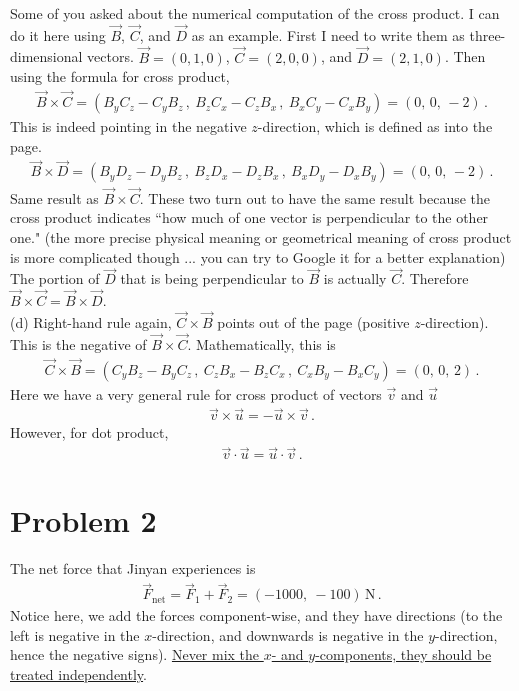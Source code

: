 \documentclass[11pt]{article}
\begin{document}
 Some of you asked about the numerical computation of the cross product. I can do it here using $\vec{B}$, $\vec{C}$, and $\vec{D}$ as an example. First I need to write them as three-dimensional vectors. $\vec{B} = (0,1,0)$, $\vec{C} = (2,0,0)$, and $\vec{D} = (2,1,0)$. Then using the formula for cross product, 
\begin{align*}
\vec{B}\times \vec{C} = \left(
B_yC_z - C_yB_z\,,\
B_zC_x - C_zB_x\,,\
B_xC_y - C_xB_y
\right) = (0,\,0,\,-2)\,.
\end{align*}
This is indeed pointing in the negative $z$-direction, which is defined as into the page.
\begin{align*}
\vec{B}\times \vec{D} = \left(
B_yD_z - D_yB_z\,,\
B_zD_x - D_zB_x\,,\
B_xD_y - D_xB_y
\right) = (0,\,0,\,-2)\,.
\end{align*}
Same result as $\vec{B}\times \vec{C}$. These two turn out to have the same result because the cross product indicates ``how much of one vector is perpendicular to the other one." (the more precise physical meaning or geometrical meaning of cross product is more complicated though ... you can try to Google it for a better explanation) The portion of $\vec{D}$ that is being perpendicular to $\vec{B}$ is actually $\vec{C}$. Therefore $\vec{B}\times \vec{C} = \vec{B}\times \vec{D}$.\\

\noindent (d) Right-hand rule again, $\vec{C}\times \vec{B}$ points out of the page (positive $z$-direction). This is the negative of $\vec{B}\times \vec{C}$. Mathematically, this is
\begin{align*}
\vec{C}\times \vec{B} = \left(
C_yB_z - B_yC_z\,,\
C_zB_x - B_zC_x\,,\
C_xB_y - B_xC_y
\right) = (0,\,0,\,2)\,.
\end{align*}
Here we have a very general rule for cross product of vectors $\vec{v}$ and $\vec{u}$
\begin{align*}
\vec{v}\times \vec{u} = -\vec{u}\times \vec{v}\,.
\end{align*}
However, for dot product, 
\begin{align*}
\vec{v}\cdot\vec{u} = \vec{u}\cdot \vec{v}\,.
\end{align*}

\section*{Problem 2}
The net force that Jinyan experiences is 
\begin{align*}
\vec{F}_{\text{net}} = \vec{F}_1 + \vec{F}_2 = (-1000,\ -100) \,\text{N}\,.
\end{align*}
Notice here, we add the forces component-wise, and they have directions (to the left is negative in the $x$-direction, and downwards is negative in the $y$-direction, hence the negative signs). \underline{Never mix the $x$- and $y$-components, they should be treated independently}.\\
\end{document}
